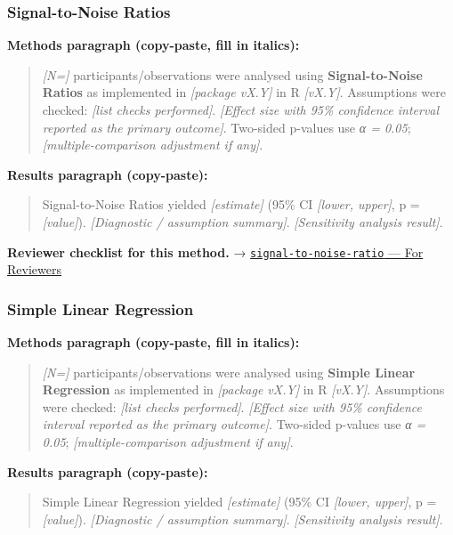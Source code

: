 \documentclass[
]{article}
\begin{document}
\subsubsection{Signal-to-Noise Ratios}\label{signal-to-noise-ratios}

\textbf{Methods paragraph (copy-paste, fill in italics):}

\begin{quote}
\emph{{[}N={]}} participants/observations were analysed using
\textbf{Signal-to-Noise Ratios} as implemented in \emph{{[}package
vX.Y{]}} in R \emph{{[}vX.Y{]}}. Assumptions were checked: \emph{{[}list
checks performed{]}}. \emph{{[}Effect size with 95\% confidence interval
reported as the primary outcome{]}}. Two-sided p-values use \emph{α =
0.05}; \emph{{[}multiple-comparison adjustment if any{]}}.
\end{quote}

\textbf{Results paragraph (copy-paste):}

\begin{quote}
Signal-to-Noise Ratios yielded \emph{{[}estimate{]}} (95\% CI
\emph{{[}lower, upper{]}}, p = \emph{{[}value{]}}). \emph{{[}Diagnostic
/ assumption summary{]}}. \emph{{[}Sensitivity analysis result{]}}.
\end{quote}

\textbf{Reviewer checklist for this method.} →
\href{../chapters/16-design/signal-to-noise-ratio.Rmd\#for-reviewers}{\texttt{signal-to-noise-ratio}
--- For Reviewers}

\subsubsection{Simple Linear Regression}\label{simple-linear-regression}

\textbf{Methods paragraph (copy-paste, fill in italics):}

\begin{quote}
\emph{{[}N={]}} participants/observations were analysed using
\textbf{Simple Linear Regression} as implemented in \emph{{[}package
vX.Y{]}} in R \emph{{[}vX.Y{]}}. Assumptions were checked: \emph{{[}list
checks performed{]}}. \emph{{[}Effect size with 95\% confidence interval
reported as the primary outcome{]}}. Two-sided p-values use \emph{α =
0.05}; \emph{{[}multiple-comparison adjustment if any{]}}.
\end{quote}

\textbf{Results paragraph (copy-paste):}

\begin{quote}
Simple Linear Regression yielded \emph{{[}estimate{]}} (95\% CI
\emph{{[}lower, upper{]}}, p = \emph{{[}value{]}}). \emph{{[}Diagnostic
/ assumption summary{]}}. \emph{{[}Sensitivity analysis result{]}}.
\end{quote}
\end{document}
